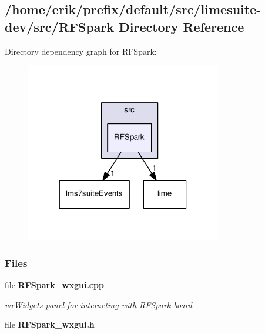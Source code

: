 \subsection{/home/erik/prefix/default/src/limesuite-\/dev/src/\+R\+F\+Spark Directory Reference}
\label{dir_f90739f4380987f73098c1201afecf61}
Directory dependency graph for R\+F\+Spark\+:
\nopagebreak
\begin{figure}[H]
\begin{center}
\leavevmode
\includegraphics[width=242pt]{dir_f90739f4380987f73098c1201afecf61_dep}
\end{center}
\end{figure}
\subsubsection*{Files}
\begin{DoxyCompactItemize}
\item 
file {\bf R\+F\+Spark\+\_\+wxgui.\+cpp}
\begin{DoxyCompactList}\small\item\em wx\+Widgets panel for interacting with R\+F\+Spark board \end{DoxyCompactList}\item 
file {\bf R\+F\+Spark\+\_\+wxgui.\+h}
\end{DoxyCompactItemize}
